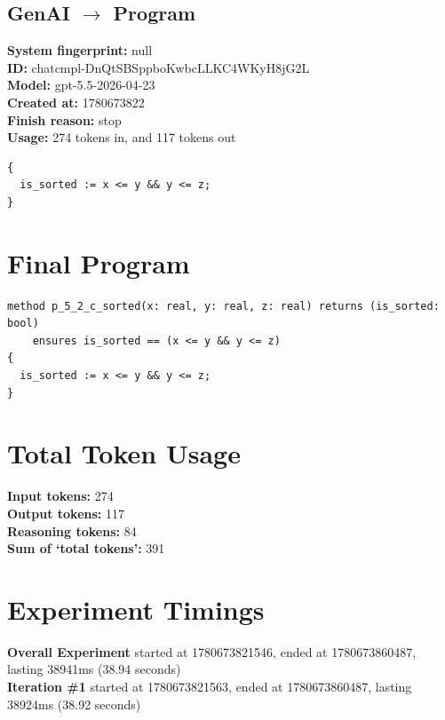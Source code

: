 \documentclass{article}
\begin{document}
\subsection*{GenAI $\rightarrow$ Program}
\textbf{System fingerprint: }null
\\\textbf{ID: }chatcmpl-DnQtSBSppboKwbcLLKC4WKyH8jG2L
\\\textbf{Model: }gpt-5.5-2026-04-23
\\\textbf{Created at: }1780673822
\\\textbf{Finish reason: }stop
\\\textbf{Usage: }274 tokens in, and 117 tokens out
\begin{lstlisting}
{
  is_sorted := x <= y && y <= z;
}
\end{lstlisting}
\section*{Final Program}
\begin{lstlisting}
method p_5_2_c_sorted(x: real, y: real, z: real) returns (is_sorted: bool)
	ensures is_sorted == (x <= y && y <= z)
{
  is_sorted := x <= y && y <= z;
}
\end{lstlisting}
\section*{Total Token Usage}
\textbf{Input tokens: }274
\\\textbf{Output tokens: }117
\\\textbf{Reasoning tokens: }84
\\\textbf{Sum of `total tokens': }391
\section*{Experiment Timings}
\textbf{Overall Experiment} started at 1780673821546, ended at 1780673860487, lasting 38941ms (38.94 seconds)
\\\textbf{Iteration \#1} started at 1780673821563, ended at 1780673860487, lasting 38924ms (38.92 seconds)
\end{document}

